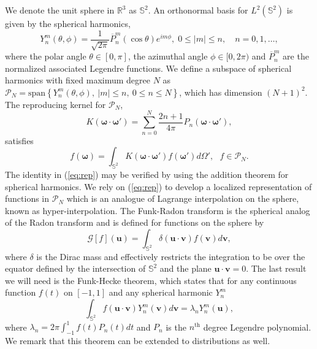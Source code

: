 \documentclass[landscape,a0b,final]{a0poster}
\newcommand{\HH}{{\mathcal P}}
\newcommand{\bomega}{{\boldsymbol{\omega}}}
\newcommand{\odotop}{{\boldsymbol{\omega}\cdot\boldsymbol{\omega}'}}
\newenvironment{poster}{
  \begin{center}
  \begin{minipage}[c]{0.98\textwidth}
}{
  \end{minipage} 
  \end{center}
}
\newcommand{\pbox}[4]{
\psshadowbox[#3]{
\begin{minipage}[t][#2][t]{#1}
#4
\end{minipage}
}}
\newcommand{\header}[1]{
\begin{center}\pbox{0.8\columnwidth}{}{linewidth=1mm,framearc=0.1,linecolor=lightblue,fillstyle=gradient,gradangle=0,gradbegin=white,gradend=whiteblue,gradmidpoint=1.0,framesep=1em}{\begin{center}\bf{#1}\end{center}}\end{center}
}
\begin{document}
\begin{poster}
\begin{multicols}{3}
We denote the unit sphere in $\mathbb{R}^{3}$ as $\mathbb{S}^{2}$. An orthonormal basis for $L^{2}\left(\mathbb{S}^{2}\right)$ is given by the spherical harmonics, 
\begin{equation}
  Y_{n}^{m}\left(\theta,\phi\right)=\frac{1}{\sqrt{2\pi}}\overline{P}_{n}^{m}\left(\cos\theta\right)e^{im\phi},\;0\le|m|\le n,\quad n=0,1,\dots,
  \label{eq:ylm}
\end{equation}
%
where the polar angle $\theta\in[0,\pi]$, the azimuthal angle $\phi\in[0,2\pi)$
and $\overline{P}_{n}^{m}$ are the normalized associated Legendre functions. We define a subspace of spherical harmonics with fixed maximum degree $N$ as $\HH_{N}=\mathrm{span}\left\{ Y_{n}^{m}\left(\theta,\phi\right),\:|m|\le n,\:0\le n\le N\right\}$, which has dimension $\left(N+1\right)^{2}$. The reproducing kernel for $\HH_{N}$, 
%
\begin{equation}
  K\left(\bomega\cdot\bomega'\right) = \sum_{n=0}^{N}\frac{2n+1}{4\pi}P_{n}\left(\odotop\right),
  \label{eq:kernel}
\end{equation}
%
satisfies 
%
\begin{equation}
  f\left(\bomega\right)=\int_{\mathbb{S}^{2}}K\left(\odotop\right)f\left(\bomega'\right)d\Omega',\,\,\,\, f\in\HH_{N}.         
  \label{eq:rep}
\end{equation}
%
The identity in (\ref{eq:rep}) may be verified by using the addition theorem for spherical harmonics.
We rely on (\ref{eq:rep}) to develop a localized representation of functions
in $\HH_{N}$ which is an analogue of Lagrange interpolation on the sphere, known as hyper-interpolation.
%
The Funk-Radon transform is the spherical analog of the Radon transform and is defined for functions on the sphere by
%
\begin{equation}
  \mathcal{G}\left[f\right]\left(\mathbf{u}\right)=\int_{\mathbb{S}^{2}} \delta\left(\mathbf{u}\cdot\mathbf{v}\right)f\left(\mathbf{v}\right)d\mathbf{v},         
  \label{eq:funk-radon}
\end{equation}
%
where $\delta$ is the Dirac mass and effectively restricts the integration to be over the equator defined by the intersection of $\mathbb{S}^2$ and the plane $\mathbf{u}\cdot\mathbf{v} = 0$. The last result we will need is the Funk-Hecke theorem, which states that for any continuous function $f\left(t\right)$ on $\left[-1,1\right]$ and any spherical harmonic $Y_n^m$
%
\begin{equation}
  \int_{\mathbb{S}^{2}} f\left(\mathbf{u}\cdot\mathbf{v}\right)Y_n^m\left(\mathbf{v}\right)d\mathbf{v} = \lambda_n Y_n^m\left(\mathbf{u}\right),         
  \label{eq:funk-hecke}
\end{equation}
%
where $\lambda_n = 2\pi \int_{-1}^{1} f\left(t\right)P_n\left(t\right)dt$ and $P_n$ is the $n^{\mathrm{th}}$ degree Legendre polynomial. We remark that this theorem can be extended to distributions as well. 
%
\header{Quadratures for the sphere}


\end{multicols}
\end{poster}
\end{document}
